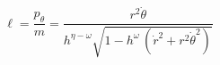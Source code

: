 \begin{equation}
\ell = \frac{p_{\theta}}{m}  = \frac{r^2 \dot{\theta}}{ h^{\eta -
\omega} \sqrt{1 - h^\omega \, (\dot{r}^2 + r^2 \dot{\theta}^2)}}
\end{equation}

